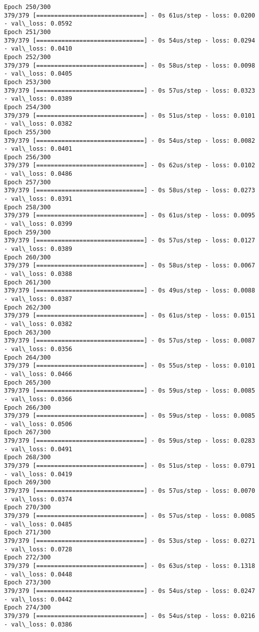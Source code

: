 \documentclass[11pt]{article}
\begin{document}
\begin{Verbatim}[commandchars=\\\{\}]
Epoch 250/300
379/379 [==============================] - 0s 61us/step - loss: 0.0200 - val\_loss: 0.0592
Epoch 251/300
379/379 [==============================] - 0s 54us/step - loss: 0.0294 - val\_loss: 0.0410
Epoch 252/300
379/379 [==============================] - 0s 58us/step - loss: 0.0098 - val\_loss: 0.0405
Epoch 253/300
379/379 [==============================] - 0s 57us/step - loss: 0.0323 - val\_loss: 0.0389
Epoch 254/300
379/379 [==============================] - 0s 51us/step - loss: 0.0101 - val\_loss: 0.0382
Epoch 255/300
379/379 [==============================] - 0s 54us/step - loss: 0.0082 - val\_loss: 0.0401
Epoch 256/300
379/379 [==============================] - 0s 62us/step - loss: 0.0102 - val\_loss: 0.0486
Epoch 257/300
379/379 [==============================] - 0s 58us/step - loss: 0.0273 - val\_loss: 0.0391
Epoch 258/300
379/379 [==============================] - 0s 61us/step - loss: 0.0095 - val\_loss: 0.0399
Epoch 259/300
379/379 [==============================] - 0s 57us/step - loss: 0.0127 - val\_loss: 0.0389
Epoch 260/300
379/379 [==============================] - 0s 58us/step - loss: 0.0067 - val\_loss: 0.0388
Epoch 261/300
379/379 [==============================] - 0s 49us/step - loss: 0.0088 - val\_loss: 0.0387
Epoch 262/300
379/379 [==============================] - 0s 61us/step - loss: 0.0151 - val\_loss: 0.0382
Epoch 263/300
379/379 [==============================] - 0s 57us/step - loss: 0.0087 - val\_loss: 0.0356
Epoch 264/300
379/379 [==============================] - 0s 55us/step - loss: 0.0101 - val\_loss: 0.0466
Epoch 265/300
379/379 [==============================] - 0s 59us/step - loss: 0.0085 - val\_loss: 0.0366
Epoch 266/300
379/379 [==============================] - 0s 59us/step - loss: 0.0085 - val\_loss: 0.0506
Epoch 267/300
379/379 [==============================] - 0s 59us/step - loss: 0.0283 - val\_loss: 0.0491
Epoch 268/300
379/379 [==============================] - 0s 51us/step - loss: 0.0791 - val\_loss: 0.0419
Epoch 269/300
379/379 [==============================] - 0s 57us/step - loss: 0.0070 - val\_loss: 0.0374
Epoch 270/300
379/379 [==============================] - 0s 57us/step - loss: 0.0085 - val\_loss: 0.0485
Epoch 271/300
379/379 [==============================] - 0s 53us/step - loss: 0.0271 - val\_loss: 0.0728
Epoch 272/300
379/379 [==============================] - 0s 63us/step - loss: 0.1318 - val\_loss: 0.0448
Epoch 273/300
379/379 [==============================] - 0s 54us/step - loss: 0.0247 - val\_loss: 0.0442
Epoch 274/300
379/379 [==============================] - 0s 54us/step - loss: 0.0216 - val\_loss: 0.0386

\end{Verbatim}
\end{document}
